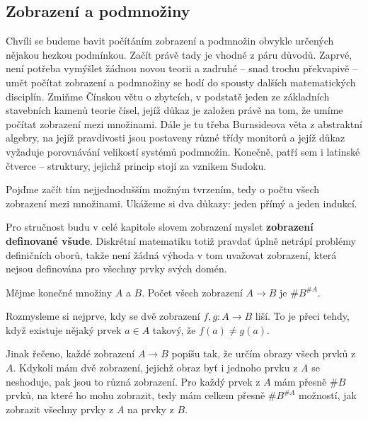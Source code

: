 \subsection{Zobrazení a podmnožiny}
\label{ssec:zobrazeni-a-podmnoziny}

Chvíli se budeme bavit počítáním zobrazení a podmnožin obvykle určených nějakou
hezkou podmínkou. Začít právě tady je vhodné z páru důvodů. Zaprvé, není potřeba
vymýšlet žádnou novou teorii a zadruhé -- snad trochu překvapivě -- umět počítat
zobrazení a podmnožiny se hodí do spousty dalších matematických disciplín.
Zmiňme Čínskou větu o zbytcích, v podstatě jeden ze základních stavebních kamenů
teorie čísel, jejíž důkaz je založen právě na tom, že umíme počítat zobrazení
mezi množinami. Dále je tu třeba Burnsideova věta z abstraktní algebry, na jejíž
pravdivosti jsou postaveny různé třídy monitorů a jejíž důkaz vyžaduje
porovnávání velikostí systémů podmnožin. Konečně, patří sem i latinské čtverce
-- struktury, jejichž princip stojí za vznikem Sudoku.

Pojďme začít tím nejjednodušším možným tvrzením, tedy o počtu všech zobrazení
mezi množinami. Ukážeme si dva důkazy: jeden přímý a jeden indukcí.

\begin{warning}
 Pro stručnost budu v celé kapitole slovem zobrazení myslet \textbf{zobrazení
 definované všude}. Diskrétní matematiku totiž pravdať úplně netrápí problémy
 definičních oborů, takže není žádná výhoda v tom uvažovat zobrazení, která
 nejsou definována pro všechny prvky svých domén.
\end{warning}

\begin{claim}
 \label{claim:pocet-zobrazeni}
 Mějme konečné množiny $A$ a $B$. Počet všech zobrazení $A \to B$ je $\# B^{\#
 A}$.
\end{claim}

\begin{enhproof}
 Rozmysleme si nejprve, kdy se dvě zobrazení $f,g:A \to B$ liší. To je přeci
 tehdy, když existuje nějaký prvek $a \in A$ takový, že $f(a) \neq g(a)$.

 Jinak řečeno, každé zobrazení $A \to B$ popíšu tak, že určím obrazy všech prvků
 z $A$. Kdykoli mám dvě zobrazení, jejichž obraz byť i jednoho prvku z $A$ se
 neshoduje, pak jsou to různá zobrazení. Pro každý prvek z $A$ mám přesně $\# B$
 prvků, na které ho mohu zobrazit, tedy mám celkem přesně $\# B^{\# A}$ možností,
 jak zobrazit všechny prvky z $A$ na prvky z $B$.
\end{enhproof}

